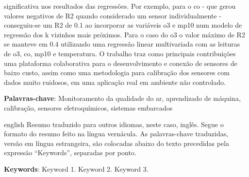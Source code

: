 \begin{resumo}
significativa nos resultados das regressões. Por exemplo, para o \acrshort{co} - que gerou valores negativos de R2 quando considerado um sensor individualmente - conseguiu-se um R2 de 0.1 ao incorporar as variáveis \acrshort{o3} e \acrshort{mp10} num modelo de regressão dos k vizinhos mais próximos. Para o caso do \acrshort{o3} o valor máximo de R2 se manteve em 0.4 utilizando uma regressão linear multivariada com as leituras de \acrshort{o3}, \acrshort{co}, \acrshort{mp10} e temperatura. O trabalho traz como principais contribuições uma plataforma colaborativa para o desenvolvimento e conexão de sensores de baixo custo, assim como uma metodologia para calibração dos sensores com dados muito ruidosos, em uma aplicação real em ambiente não controlado.
	
	\textbf{Palavras-chave}: Monitoramento da qualidade do ar, aprendizado de máquina, calibração, sensores eletroquímicos, sistemas embarcados
\end{resumo}

\begin{resumo}[Abstract]
	\SingleSpacing
	\begin{otherlanguage*}{english}
		Resumo traduzido para outros idiomas, neste caso, inglês. Segue o formato do resumo feito na língua vernácula. As palavras-chave traduzidas, versão em língua estrangeira, são colocadas abaixo do texto precedidas pela expressão “Keywords”, separadas por ponto.
		
		\textbf{Keywords}: Keyword 1. Keyword 2. Keyword 3.
	\end{otherlanguage*}
\end{resumo}

% 
%
%  

